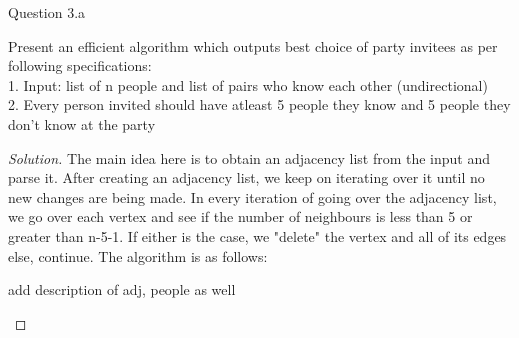 \begin{solution}{Question 3.a}
    \begin{question}[]
        Present an efficient algorithm which outputs best choice of party invitees as per following specifications:\\
        1. Input: list of n people and list of pairs who know each other (undirectional)\\
        2. Every person invited should have atleast 5 people they know and 5 people they don't know at the party
    \end{question}
    \tcblower{}
    \begin{proof}[Solution]
        The main idea here is to obtain an adjacency list from the input and parse it. After creating an adjacency list, we keep on iterating over it until no new changes are being made. In every iteration of going over the adjacency list, we go over each vertex and see if the number of neighbours is less than 5 or greater than n-5-1. If either is the case, we "delete" the vertex and all of its edges else, continue. The algorithm is as follows: %
        
        add description of adj, people as well
        
        \begin{algorithm}[H]
            \caption{Generate list of invitees for 3.a}
            \begin{algorithmic}[1]
                        \EndIf{}
                        \EndIf{}
                        \EndIf{}
                    \EndWhile{}
                    \EndFor{}
                \EndProcedure{}
            \end{algorithmic}
        \end{algorithm}
        

\end{proof}
\end{solution}
